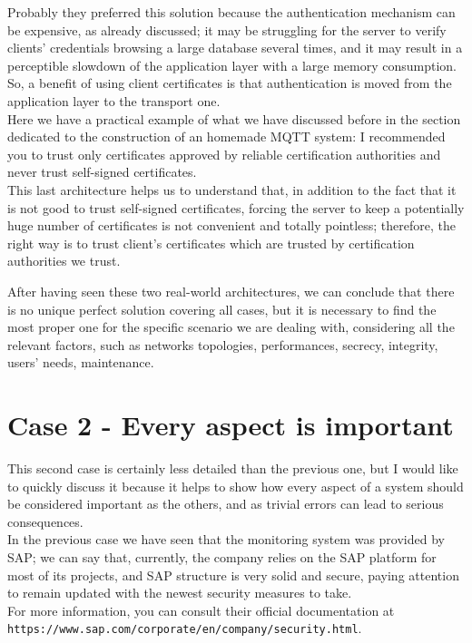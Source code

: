 \documentclass[12pt]{report}
\begin{document}
{{Probably they preferred this solution because the authentication mechanism can be expensive, as already discussed; it may be struggling for the server to verify clients' credentials browsing a large database several times, and it may result in a perceptible slowdown of the application layer with a large memory consumption.\\
So, a benefit of using client certificates is that authentication is moved from the application layer to the transport one.\\

Here we have a practical example of what we have discussed before in the section dedicated to the construction of an homemade MQTT system: I recommended you to trust only certificates approved by reliable certification authorities and never trust self-signed certificates. \\
This last architecture helps us to understand that, in addition to the fact that it is not good to trust self-signed certificates, forcing the server to keep a potentially huge number of certificates is not convenient and totally pointless; therefore, the right way is to trust client's certificates which are trusted by certification authorities we trust.\\

\bigskip

After having seen these two real-world architectures, we can conclude that there is no unique perfect solution covering all cases, but it is necessary to find the most proper one for the specific scenario we are dealing with, considering all the relevant factors, such as networks topologies, performances, secrecy, integrity, users' needs, maintenance.\\



\section{Case 2 - Every aspect is important }
\bigskip
This second case is certainly less detailed than the previous one, but I would like to quickly discuss it because it helps to show how every aspect of a system should be considered important as the others, and as trivial errors can lead to serious consequences.\\

In the previous case we have seen that the monitoring system was provided by SAP; we can say that, currently, the company relies on the SAP platform for most of its projects, and SAP structure is very solid and secure, paying attention to remain updated with the newest security measures to take.\\
For more information, you can consult their official documentation at \\ \texttt{https://www.sap.com/corporate/en/company/security.html}.\\

}}
\end{document}
